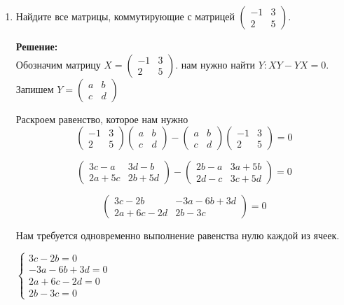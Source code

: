 \documentclass[a4paper,12pt]{article}
\begin{document}
\begin{enumerate}
\item Найдите все матрицы, коммутирующие с матрицей
$\begin{pmatrix}
-1 & 3\\
2 & 5
\end{pmatrix}.$

\textbf{Решение:}\\
Обозначим матрицу $X=\begin{pmatrix}
-1 & 3\\
2 & 5
\end{pmatrix}$. нам нужно найти $Y:XY-YX=0$. Запишем $Y=\begin{pmatrix}
a & b\\
c & d
\end{pmatrix}$


Раскроем равенство, которое нам нужно $$\begin{pmatrix}
-1 & 3\\
2 & 5
\end{pmatrix}\begin{pmatrix}
a & b\\
c & d
\end{pmatrix}-\begin{pmatrix}
a & b\\
c & d
\end{pmatrix}\begin{pmatrix}
-1 & 3\\
2 & 5
\end{pmatrix}=0$$

$$\begin{pmatrix}
3c-a & 3d-b\\
2a+5c & 2b+5d
\end{pmatrix}-\begin{pmatrix}
2b-a & 3a+5b\\
2d-c & 3c+5d
\end{pmatrix}=0$$

$$\begin{pmatrix}
3c-2b & -3a-6b+3d\\
2a+6c-2d & 2b-3c
\end{pmatrix}=0$$

Нам требуется одновременно выполнение равенства нулю каждой из ячеек.

$\begin{cases}
3c-2b=0\\
-3a-6b+3d=0\\
2a+6c-2d=0\\
2b-3c=0 
\end{cases}$


\end{enumerate}
\end{document}
